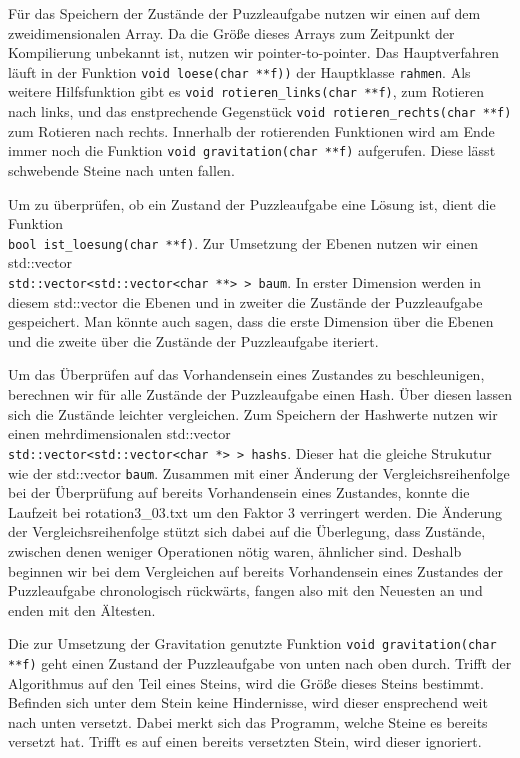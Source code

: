 	Für das Speichern der Zustände der Puzzleaufgabe nutzen wir einen auf dem zweidimensionalen Array. 
	Da die Größe dieses Arrays zum Zeitpunkt der Kompilierung unbekannt ist, nutzen wir pointer-to-pointer.
	Das Hauptverfahren läuft in der Funktion \texttt{void loese(char **f))} der Hauptklasse \texttt{rahmen}.
  Als weitere Hilfsfunktion gibt es \texttt{void rotieren\_links(char **f)}, zum Rotieren nach links, 
	und das enstprechende Gegenstück \texttt{void rotieren\_rechts(char **f)} zum Rotieren nach rechts.
	Innerhalb der rotierenden Funktionen wird am Ende immer noch die Funktion \texttt{void gravitation(char **f)} aufgerufen.
	Diese lässt schwebende Steine nach unten fallen. 
	
	Um zu überprüfen, ob ein Zustand der Puzzleaufgabe eine Lösung ist, dient die Funktion \\
	\texttt{bool ist\_loesung(char **f)}.
	Zur Umsetzung der Ebenen nutzen wir einen std::vector \\\texttt{std::vector<std::vector<char **> > baum}.
	In erster Dimension werden in diesem std::vector die Ebenen und in zweiter die Zustände der Puzzleaufgabe gespeichert. 
	Man könnte auch sagen, dass die erste Dimension über die Ebenen und die zweite über die Zustände der Puzzleaufgabe iteriert.

	Um das Überprüfen auf das Vorhandensein eines Zustandes zu beschleunigen, berechnen wir für alle Zustände der Puzzleaufgabe einen Hash.
	Über diesen lassen sich  die Zustände leichter vergleichen. Zum Speichern der Hashwerte nutzen 
	wir einen mehrdimensionalen std::vector \\\texttt{std::vector<std::vector<char *> > hashs}. Dieser hat die gleiche Strukutur wie der std::vector \texttt{baum}.
	 Zusammen mit einer Änderung der Vergleichsreihenfolge
	bei der Überprüfung auf bereits Vorhandensein eines Zustandes, konnte die Laufzeit bei rotation3\_03.txt um den Faktor 3 verringert werden.
	Die Änderung der Vergleichsreihenfolge stützt sich dabei auf die Überlegung, dass Zustände, zwischen denen weniger Operationen nötig waren, ähnlicher sind.
	Deshalb beginnen wir bei dem Vergleichen auf bereits Vorhandensein eines Zustandes der Puzzleaufgabe chronologisch rückwärts, 
	fangen also mit den Neuesten an und enden mit den Ältesten.

	Die zur Umsetzung der Gravitation genutzte Funktion \texttt{void gravitation(char **f)} geht einen Zustand der Puzzleaufgabe von unten nach oben durch.
	Trifft der Algorithmus auf den Teil eines Steins, wird die Größe dieses Steins bestimmt. Befinden sich unter dem Stein keine Hindernisse, 
	wird dieser ensprechend weit nach unten versetzt. Dabei merkt sich das Programm, welche Steine es bereits versetzt hat. 
	Trifft es auf einen bereits versetzten Stein, wird dieser ignoriert.

 
	
	
